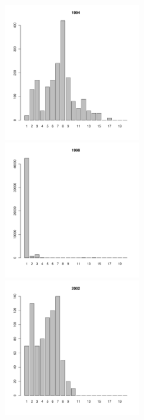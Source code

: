 \begin{figure}[h]
\begin{multicols}{3}
\hfill
\includegraphics[width=60mm]{../White_Sea/Luvenga_Goreliy/midlow_1994_.pdf}
\hfill
\includegraphics[width=60mm]{../White_Sea/Luvenga_Goreliy/midlow_1998_.pdf}
\hfill
\includegraphics[width=60mm]{../White_Sea/Luvenga_Goreliy/midlow_2002_.pdf}
\end{multicols}



\end{figure}
